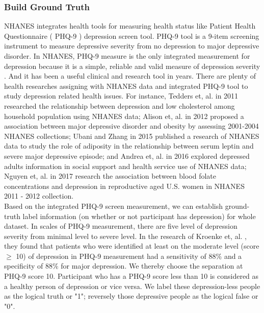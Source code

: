 \documentclass[12pt]{article}
\begin{document}
\subsubsection{Build Ground Truth}
NHANES integrates health tools for measuring health status like Patient Health Questionnaire ( PHQ-9 ) depression screen tool. PHQ-9 tool is a 9-item screening instrument to measure depressive severity from no depression to major depressive disorder. In NHANES, PHQ-9 measure is the only integrated measurement for depression because it is a simple, reliable and valid measure of depression severity \cite{Kroenke}. And it has been a useful clinical and research tool in years. There are plenty of health researches assigning with NHANES data and integrated PHQ-9 tool to study depression related health issues. For instance, Tedders et, al. \cite{Tedders} in 2011 researched the relationship between depression and low cholesterol among household population using NHANES data; Alison et, al. \cite{Merkangas} in 2012 proposed a association between major depressive disorder and obesity by assessing 2001-2004 NHANES collections; Ubani and Zhang \cite{Ubani} in 2015 published a research of NHANES data to study the role of adiposity in the relationship between serum leptin and severe major depressive episode; and Andrea et, al. \cite{Andrea} in 2016 explored depressed adults information in social support and health service use of NHANES data; Nguyen et, al. \cite{Nguyen} in 2017 research the association between blood folate concentrations and depression in reproductive aged U.S. women in NHANES 2011 - 2012 collection.
\\

Based on the integrated PHQ-9 screen measurement, we can establish ground-truth label information (on whether or not participant has depression) for whole dataset. In scales of PHQ-9 measurement, there are five level of depression severity from minimal level to severe level. In the research of Kroenke et, al. \cite{Kroenke}, they found that patients who were identified at least on the moderate level (score $\geq$ 10) of depression in PHQ-9 measurement had a sensitivity of 88\% and a specificity of 88\% for major depression. We thereby choose the separation at PHQ-9 score 10. Participant who has a PHQ-9 score less than 10 is considered as a healthy person of depression or vice versa. We label these depression-less people as the logical truth or "1"; reversely those depressive people as the logical false or  "0".
\\
\smallskip
\end{document}
